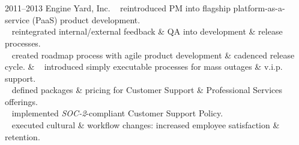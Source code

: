 \documentclass[]{friggeri-cv} %
\begin{document}
\section{{}{} {\normalsize{}~~}}

\begin{entrylist}
\entry
{2011--2013}
{Engine Yard, Inc.}
{}
{{\tiny {}} ~ reintroduced PM into flagship platform-as-a-service (PaaS) product development.\\
{\tiny {}} ~ reintegrated internal/external feedback \& QA into development \& release processes.\\
{\tiny {}} ~ created roadmap process with agile product development \& cadenced release cycle.}
\entry
{}
{}
{ \& }
{{\tiny {}} ~ introduced simply executable processes for mass outages \& v.i.p. support.\\
{\tiny {}} ~ defined packages \& pricing for Customer Support \& Professional Services offerings.\\
{\tiny {}} ~ implemented \emph{SOC-2}-compliant Customer Support Policy.\\

{\tiny {}} ~ executed cultural \& workflow changes: increased employee satisfaction \& retention.\\

}
\end{entrylist}
\end{document}
